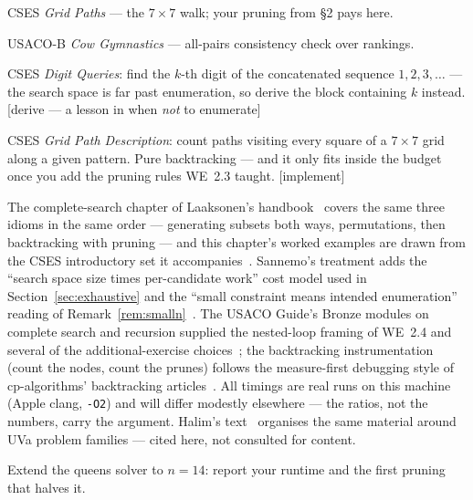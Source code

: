\begin{exercise}[medium] CSES \emph{Grid Paths} --- the $7\times7$ walk; your pruning from \S2 pays here. \end{exercise}
\begin{exercise}[medium] USACO-B \emph{Cow Gymnastics} --- all-pairs consistency check over rankings. \end{exercise}
\begin{exercise}[hard] CSES \emph{Digit Queries}: find the $k$-th digit of
the concatenated sequence $1, 2, 3, \dots$ --- the search space is far past
enumeration, so derive the block containing $k$ instead. [derive --- a lesson
in when \emph{not} to enumerate]
\end{exercise}
\begin{exercise}[hard] CSES \emph{Grid Path Description}: count paths
visiting every square of a $7 \times 7$ grid along a given pattern. Pure
backtracking --- and it only fits inside the budget once you add the pruning
rules WE~2.3 taught. [implement]
\end{exercise}

\chapternotes
The complete-search chapter of Laaksonen's handbook~\cite{laaksonen2024}
covers the same three idioms in the same order --- generating subsets both
ways, permutations, then backtracking with pruning --- and this chapter's
worked examples are drawn from the CSES introductory set it
accompanies~\cite{cses}. Sannemo's treatment adds the ``search space size
times per-candidate work'' cost model used in Section~\ref{sec:exhaustive}
and the ``small constraint means intended enumeration'' reading of
Remark~\ref{rem:smalln}~\cite{sannemo2025}. The USACO Guide's Bronze modules
on complete search and recursion supplied the nested-loop framing of WE~2.4
and several of the additional-exercise choices~\cite{usacoguide}; the
backtracking instrumentation (count the nodes, count the prunes) follows the
measure-first debugging style of cp-algorithms' backtracking
articles~\cite{cpalgorithms}. All timings are real runs on this machine
(Apple clang, \texttt{-O2}) and will differ modestly elsewhere --- the
ratios, not the numbers, carry the argument. Halim's text~\cite{halimcp4}
organises the same material around UVa problem families --- cited here, not
consulted for content.

\begin{exercise}[hard] Extend the queens solver to $n=14$: report your runtime and the first pruning that halves it. \end{exercise}

